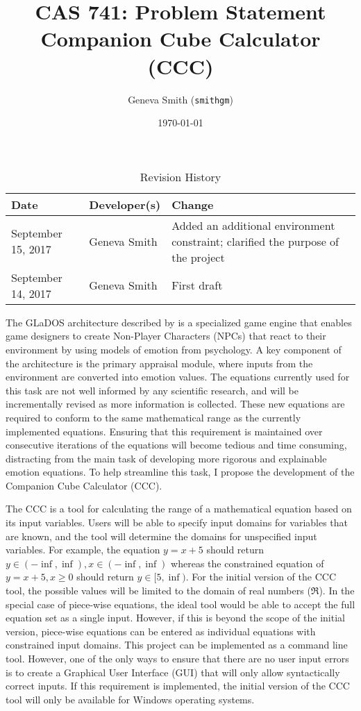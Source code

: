 \documentclass{article}
\title{CAS 741: Problem Statement\\Companion Cube Calculator (CCC)}
\author{Geneva Smith (\texttt{smithgm})}
\date{\today}
\begin{document}
\maketitle

\begin{table}[hp]
\caption{Revision History} \label{TblRevisionHistory}
\begin{tabularx}{\textwidth}{llX}
\toprule
\textbf{Date} & \textbf{Developer(s)} & \textbf{Change}\\
\midrule
September 15, 2017 & Geneva Smith & Added an additional environment constraint; 
clarified the purpose of the project \\
September 14, 2017 & Geneva Smith & First draft \\
\bottomrule
\end{tabularx}
\end{table}

The GLaDOS architecture described by \citet{glados} is a specialized game 
engine that 
enables 
game designers to create Non-Player Characters (NPCs) that react to their 
environment by using models of emotion from psychology. A key component of the 
architecture is the primary appraisal module, where inputs from the environment 
are converted into emotion values. The equations currently used for this task 
are not well informed by any scientific research, and will be incrementally 
revised as more information is collected. These new equations are required to 
conform to the same mathematical range as the currently implemented equations. 
Ensuring that this requirement is maintained over consecutive iterations of the 
equations will become tedious and time consuming, distracting from the main 
task of developing more rigorous and explainable emotion equations. To help 
streamline this task, I propose the development of the Companion Cube 
Calculator (CCC).

The CCC is a tool for calculating the range of a mathematical equation based on 
its input variables. Users will be able to specify input domains for variables 
that are known, and the tool will determine the domains for unspecified input 
variables. For example, the equation $y = x + 5$ should return $y \in (-\inf, 
\inf), x \in (-\inf, \inf)$ whereas the constrained equation of $y = x + 5, x 
\geq 0$ should return $y \in [5, \inf)$. For the initial version of the CCC 
tool, the possible values will be limited to the domain of real numbers 
($\Re$). In the special case of piece-wise equations, the ideal tool would be 
able to accept the full equation set as a single input. However, if this is 
beyond the scope of the initial version, piece-wise equations can be entered as 
individual equations with constrained input domains. This project can be 
implemented as a command line tool. However, one of the only ways to ensure 
that there are no user input errors is to create a Graphical User Interface 
(GUI) that will only allow syntactically correct inputs. If this requirement is 
implemented, the initial version of the CCC tool will only be available for 
Windows operating systems.
\end{document}

